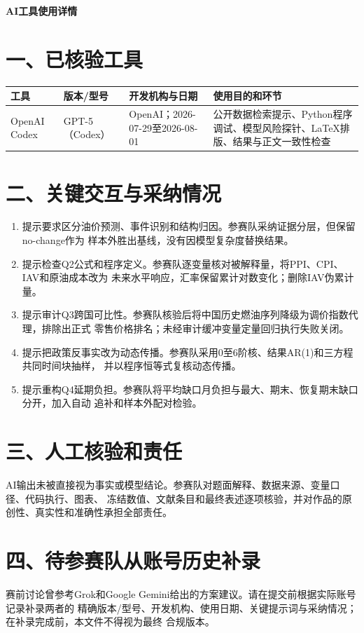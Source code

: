 \documentclass[12pt,a4paper]{ctexart}
\begin{document}
\begin{center}
  {\bfseries AI工具使用详情}
\end{center}

\section*{一、已核验工具}

\begin{longtable}{p{}p{}p{}p{}}
\toprule
工具 & 版本/型号 & 开发机构与日期 & 使用目的和环节 \\
\midrule
OpenAI Codex & GPT-5（Codex） & OpenAI；2026-07-29至2026-08-01 & 公开数据检索提示、Python程序调试、模型风险探针、LaTeX排版、结果与正文一致性检查 \\
\bottomrule
\end{longtable}

\section*{二、关键交互与采纳情况}

\begin{enumerate}
  \item 提示要求区分油价预测、事件识别和结构归因。参赛队采纳证据分层，但保留no-change作为
  样本外胜出基线，没有因模型复杂度替换结果。
  \item 提示检查Q2公式和程序定义。参赛队逐变量核对被解释量，将PPI、CPI、IAV和原油成本改为
  未来水平响应，汇率保留累计对数变化；删除IAV伪累计量。
  \item 提示审计Q3跨国可比性。参赛队核验后将中国历史燃油序列降级为调价指数代理，排除出正式
  零售价格排名；未经审计缓冲变量定量回归执行失败关闭。
  \item 提示把政策反事实改为动态传播。参赛队采用0至6阶核、结果AR(1)和三方程共同时间块抽样，
  并以程序恒等式复核动态传播。
  \item 提示重构Q4延期负担。参赛队将平均缺口月负担与最大、期末、恢复期末缺口分开，加入自动
  追补和样本外配对检验。
\end{enumerate}

\section*{三、人工核验和责任}

AI输出未被直接视为事实或模型结论。参赛队对题面解释、数据来源、变量口径、代码执行、图表、
冻结数值、文献条目和最终表述逐项核验，并对作品的原创性、真实性和准确性承担全部责任。

\section*{四、待参赛队从账号历史补录}

赛前讨论曾参考Grok和Google Gemini给出的方案建议。请在提交前根据实际账号记录补录两者的
精确版本/型号、开发机构、使用日期、关键提示词与采纳情况；在补录完成前，本文件不得视为最终
合规版本。
\end{document}
